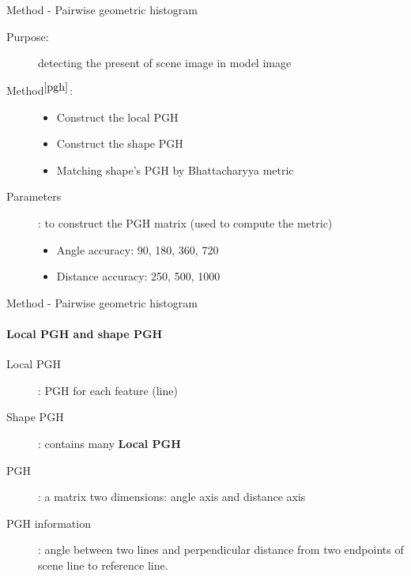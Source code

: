 \documentclass{beamer}
\begin{document}
\begin{frame}{Method - Pairwise geometric histogram}
	\begin{description}
		\item[Purpose:] detecting the present of scene image in model image
		\item[Method$^{\cite{pgh}}$:]
		\begin{itemize}
			\item Construct the local PGH
			\item Construct the shape PGH
			\item Matching shape's PGH by Bhattacharyya metric
		\end{itemize}
		\item[Parameters]: to construct the PGH matrix (used to compute the metric)
			\begin{itemize}
				\item Angle accuracy: 90, 180, 360, 720
				\item Distance accuracy: 250, 500, 1000
			\end{itemize}
	\end{description}
\end{frame}
\begin{frame}{Method - Pairwise geometric histogram}
	\framesubtitle{Local PGH and shape PGH}
	\begin{description}
		\item[Local PGH]: PGH for each feature (line)
		\item[Shape PGH]: contains many \textbf{Local PGH}
		\item[PGH]: a matrix two dimensions: angle axis and distance axis
		\item[PGH information]: angle between two lines and perpendicular distance from two endpoints of scene line to reference line.
	\end{description}
\end{frame}
\end{document}
